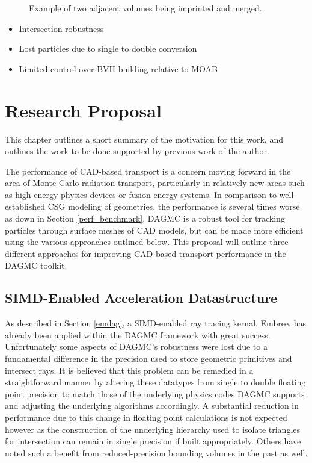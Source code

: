 \documentclass[12pt, a4paper]{article}
\begin{document}
\begin{figure}
  \caption{Example of two adjacent volumes being imprinted and merged.}
\end{figure}


\begin{itemize}
\item Intersection robustness
\item Lost particles due to single to double conversion
\item Limited control over BVH building relative to MOAB
\end{itemize}

\section{Research Proposal}%
\label{research_proposal}

This chapter outlines a short summary of the motivation for this work, and outlines the work to be done supported by previous work of the author.

The performance of CAD-based transport is a concern moving forward in the area of Monte Carlo radiation transport, particularly in relatively new areas such as high-energy physics devices or fusion energy systems. In comparison to well-established CSG modeling of geometries, the performance is several times worse as down in Section \ref{perf_benchmark}. DAGMC is a robust tool for tracking particles through surface meshes of CAD models, but can be made more efficient using the various approaches outlined below. This proposal will outline three different approaches for improving CAD-based transport performance in the DAGMC toolkit.

\subsection{SIMD-Enabled Acceleration Datastructure}

As described in Section \ref{emdag}, a SIMD-enabled ray tracing kernal, Embree, has already been applied within the DAGMC framework with great success. Unfortunately some aspects of DAGMC's robustness were lost due to a fundamental difference in the precision used to store geometric primitives and intersect rays. It is believed that this problem can be remedied in a straightforward manner by altering these datatypes from single to double floating point precision to match those of the underlying physics codes DAGMC supports and adjusting the underlying algorithms accordingly. A substantial reduction in performance due to this change in floating point calculations is not expected however as the construction of the underlying hierarchy used to isolate triangles for intersection can remain in single precision if built appropriately. Others have noted such a benefit from reduced-precision bounding volumes in the past as well\cite{Mahovsky_2005}.
\end{document}
